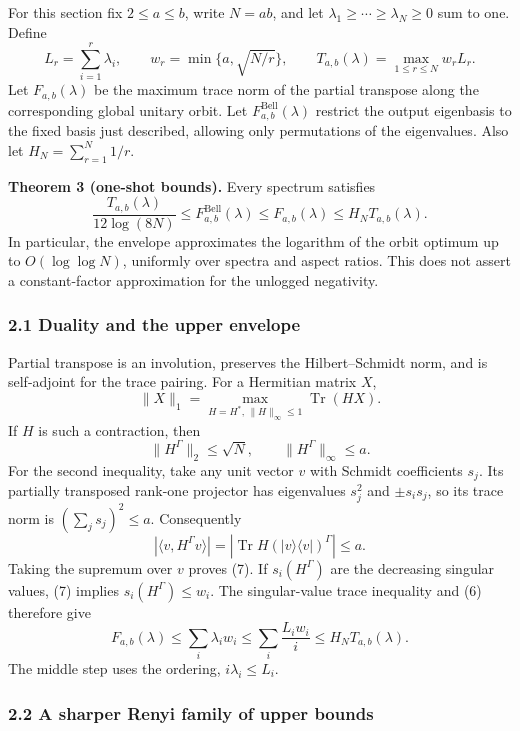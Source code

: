 \documentclass[11pt]{article}
\begin{document}
For this section fix \(2\le a\le b\), write \(N=ab\), and let \(\lambda_1\ge\cdots\ge\lambda_N\ge0\) sum to one. Define \[
 L_r=\sum_{i=1}^r\lambda_i,\qquad
 w_r=\min\{a,\sqrt{N/r}\},\qquad
 T_{a,b}(\lambda)=\max_{1\le r\le N}w_rL_r.
 \tag{4}
\] Let \(F_{a,b}(\lambda)\) be the maximum trace norm of the partial transpose along the corresponding global unitary orbit. Let \(F^{\mathrm{Bell}}_{a,b}(\lambda)\) restrict the output eigenbasis to the fixed basis just described, allowing only permutations of the eigenvalues. Also let \(H_N=\sum_{r=1}^N1/r\).

\textbf{Theorem 3 (one-shot bounds).} Every spectrum satisfies \[
 \frac{T_{a,b}(\lambda)}{12\log(8N)}
 \le F^{\mathrm{Bell}}_{a,b}(\lambda)\le F_{a,b}(\lambda)\le H_NT_{a,b}(\lambda).
 \tag{5}
\] In particular, the envelope approximates the logarithm of the orbit optimum up to \(O(\log\log N)\), uniformly over spectra and aspect ratios. This does not assert a constant-factor approximation for the unlogged negativity.

\hypertarget{duality-and-the-upper-envelope}{%
\subsubsection{2.1 Duality and the upper envelope}\label{duality-and-the-upper-envelope}}

Partial transpose is an involution, preserves the Hilbert--Schmidt norm, and is self-adjoint for the trace pairing. For a Hermitian matrix \(X\), \[
 \|X\|_1=\max_{H=H^*,\,\|H\|_\infty\le1}\operatorname{Tr}(HX).
 \tag{6}
\] If \(H\) is such a contraction, then \[
 \|H^\Gamma\|_2\le\sqrt N,\qquad \|H^\Gamma\|_\infty\le a.
 \tag{7}
\] For the second inequality, take any unit vector \(v\) with Schmidt coefficients \(s_j\). Its partially transposed rank-one projector has eigenvalues \(s_j^2\) and \(\pm s_i s_j\), so its trace norm is \((\sum_j s_j)^2\le a\). Consequently \[
 |\langle v,H^\Gamma v\rangle|
 =|\operatorname{Tr}H(|v\rangle\langle v|)^\Gamma|\le a.
\] Taking the supremum over \(v\) proves (7). If \(s_i(H^\Gamma)\) are the decreasing singular values, (7) implies \(s_i(H^\Gamma)\le w_i\). The singular-value trace inequality and (6) therefore give \[
 F_{a,b}(\lambda)\le\sum_i\lambda_iw_i
 \le\sum_i\frac{L_iw_i}{i}\le H_NT_{a,b}(\lambda).
 \tag{8}
\] The middle step uses the ordering, \(i\lambda_i\le L_i\).

\hypertarget{a-sharper-renyi-family-of-upper-bounds}{%
\subsubsection{2.2 A sharper Renyi family of upper bounds}\label{a-sharper-renyi-family-of-upper-bounds}}
\end{document}
